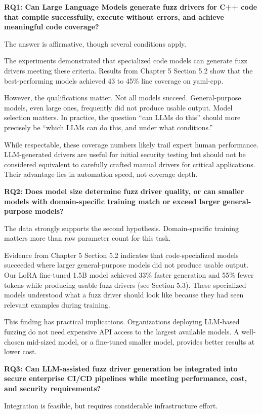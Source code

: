 \textbf{RQ1: Can Large Language Models generate fuzz drivers for C++ code that compile successfully, execute without errors, and achieve meaningful code coverage?}

The answer is affirmative, though several conditions apply.

The experiments demonstrated that specialized code models can generate fuzz drivers meeting these criteria. Results from Chapter 5 Section 5.2 show that the best-performing models achieved 43 to 45\% line coverage on yaml-cpp.

However, the qualifications matter. Not all models succeed. General-purpose models, even large ones, frequently did not produce usable output. Model selection matters. In practice, the question ``can LLMs do this'' should more precisely be ``which LLMs can do this, and under what conditions.''

While respectable, these coverage numbers likely trail expert human performance. LLM-generated drivers are useful for initial security testing but should not be considered equivalent to carefully crafted manual drivers for critical applications. Their advantage lies in automation speed, not coverage depth.

\textbf{RQ2: Does model size determine fuzz driver quality, or can smaller models with domain-specific training match or exceed larger general-purpose models?}

The data strongly supports the second hypothesis. Domain-specific training matters more than raw parameter count for this task.

Evidence from Chapter 5 Section 5.2 indicates that code-specialized models succeeded where larger general-purpose models did not produce usable output. Our LoRA fine-tuned 1.5B model achieved 33\% faster generation and 55\% fewer tokens while producing usable fuzz drivers (see Section 5.3). These specialized models understood what a fuzz driver should look like because they had seen relevant examples during training.

This finding has practical implications. Organizations deploying LLM-based fuzzing do not need expensive API access to the largest available models. A well-chosen mid-sized model, or a fine-tuned smaller model, provides better results at lower cost.

\textbf{RQ3: Can LLM-assisted fuzz driver generation be integrated into secure enterprise CI/CD pipelines while meeting performance, cost, and security requirements?}

Integration is feasible, but requires considerable infrastructure effort.


